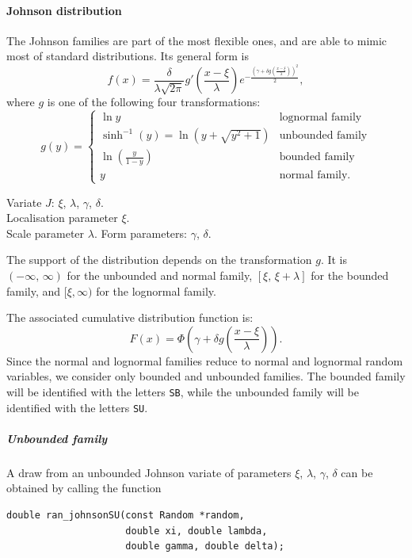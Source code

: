 
\paragraph{Johnson distribution}

The Johnson families are part of the most flexible ones, and are able
to mimic most of standard distributions.
Its general form is 
\[
f(x) = \frac{\delta}{\lambda\sqrt{2\pi}} g' \left(
  \frac{x-\xi}{\lambda} \right)
e^{ -\frac{\left(\gamma + \delta g \left( \frac{x-\xi}{\lambda} \right)\right)^2}{2} },
\]
where $g$ is one of the following four transformations:
\[
g(y) = \begin{cases}
\ln y & \mbox{lognormal family} \\
\sinh^{-1}(y) = \ln \left( y + \sqrt{y^2+1}\right) & \mbox{unbounded family} \\
\ln \left( \frac{y}{1-y} \right) & \mbox{bounded family} \\
y & \mbox{normal family}.
\end{cases}
\]
\begin{center}
Variate $J$: $\xi$, $\lambda$, $\gamma$, $\delta$.\\
Localisation parameter $\xi$.\\
Scale parameter $\lambda$.
Form parameters: $\gamma$, $\delta$. \\
\end{center}
The support of the distribution depends on the transformation $g$. It
is $(-\infty,\,\infty)$ for the unbounded and normal family,
$[\xi,\,\xi + \lambda]$ for the bounded family, and $[\xi, \infty)$
for the lognormal family.

The associated cumulative distribution function is:
\[
F(x) = \Phi\left(\gamma+\delta g \left( \frac{x-\xi}{\lambda} \right)\right).
\]
Since the normal and lognormal families reduce to normal and lognormal
random variables, we consider only bounded and unbounded families.
The bounded family will be identified with the letters \verb|SB|,
while the unbounded family will be identified with the letters \verb|SU|.

\subparagraph{Unbounded family}

A draw from an unbounded Johnson variate of parameters $\xi$,
$\lambda$, $\gamma$, $\delta$ can be obtained by calling the function
\begin{verbatim}
double ran_johnsonSU(const Random *random,
                     double xi, double lambda,
                     double gamma, double delta);
\end{verbatim}

